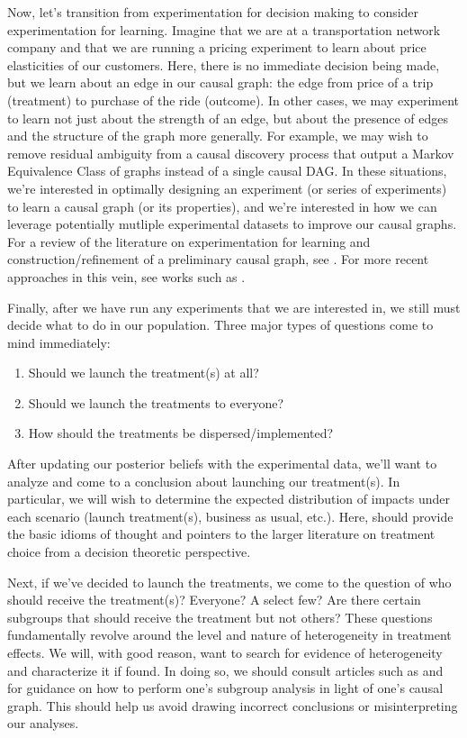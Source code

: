 Now, let's transition from experimentation for decision making to consider experimentation for learning.
Imagine that we are at a transportation network company and that we are running a pricing experiment to learn about price elasticities of our customers.
Here, there is no immediate decision being made, but we learn about an edge in our causal graph: the edge from price of a trip (treatment) to purchase of the ride (outcome).
In other cases, we may experiment to learn not just about the strength of an edge, but about the presence of edges and the structure of the graph more generally.
For example, we may wish to remove residual ambiguity from a causal discovery process that output a Markov Equivalence Class of graphs instead of a single causal DAG.
In these situations, we're interested in optimally designing an experiment (or series of experiments) to learn a causal graph (or its properties), and we're interested in how we can leverage potentially mutliple experimental datasets to improve our causal graphs.
For a review of the literature on experimentation for learning and construction/refinement of a preliminary causal graph, see \citet[Sec. 3.1.2]{kalisch_2014_causal}.
For more recent approaches in this vein, see works such as \citet{triantafillou_2015_constraint, kocaoglu_2017_experimental, brouillard_2020_differentiable, rantanen_2020_learning}.

Finally, after we have run any experiments that we are interested in, we still must decide what to do in our population.
Three major types of questions come to mind immediately:
\begin{enumerate}
   \item Should we launch the treatment(s) at all?
   \item Should we launch the treatments to everyone?
   \item How should the treatments be dispersed/implemented?
\end{enumerate}

After updating our posterior beliefs with the experimental data, we'll want to analyze and come to a conclusion about launching our treatment(s).
In particular, we will wish to determine the expected distribution of impacts under each scenario (launch treatment(s), business as usual, etc.).
Here, \citet{manski_2019_treatment} should provide the basic idioms of thought and pointers to the larger literature on treatment choice from a decision theoretic perspective.

Next, if we've decided to launch the treatments, we come to the question of who should receive the treatment(s)?
Everyone?
A select few?
Are there certain subgroups that should receive the treatment but not others?
These questions fundamentally revolve around the level and nature of heterogeneity in treatment effects.
We will, with good reason, want to search for evidence of heterogeneity and characterize it if found.
In doing so, we should consult articles such as \citet{pearl_2017_detecting} and \citet{webster_2020_subgroup} for guidance on how to perform one's subgroup analysis in light of one's causal graph.
This should help us avoid drawing incorrect conclusions or misinterpreting our analyses.

